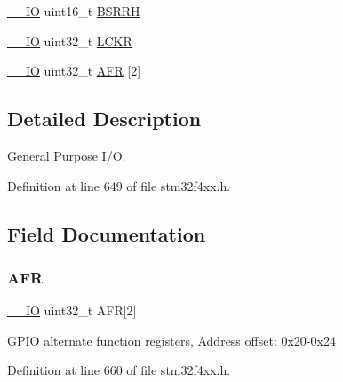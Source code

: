 \begin{DoxyCompactItemize}
\hyperlink{group___c_m_s_i_s__core__definitions_gaec43007d9998a0a0e01faede4133d6be}{\+\_\+\+\_\+\+IO} uint16\+\_\+t \hyperlink{struct_g_p_i_o___type_def_a35f89f65edca7ed58738166424aeef48}{B\+S\+R\+RH}
\item 
\hyperlink{group___c_m_s_i_s__core__definitions_gaec43007d9998a0a0e01faede4133d6be}{\+\_\+\+\_\+\+IO} uint32\+\_\+t \hyperlink{struct_g_p_i_o___type_def_a2612a0f4b3fbdbb6293f6dc70105e190}{L\+C\+KR}
\item 
\hyperlink{group___c_m_s_i_s__core__definitions_gaec43007d9998a0a0e01faede4133d6be}{\+\_\+\+\_\+\+IO} uint32\+\_\+t \hyperlink{struct_g_p_i_o___type_def_ab67c1158c04450d19ad483dcd2192e43}{A\+FR} \mbox{[}2\mbox{]}
\end{DoxyCompactItemize}


\subsection{Detailed Description}
General Purpose I/O. 

Definition at line 649 of file stm32f4xx.\+h.



\subsection{Field Documentation}
\mbox{\label{struct_g_p_i_o___type_def_ab67c1158c04450d19ad483dcd2192e43}} 
\subsubsection{\texorpdfstring{A\+FR}{AFR}}
{\footnotesize\ttfamily \hyperlink{group___c_m_s_i_s__core__definitions_gaec43007d9998a0a0e01faede4133d6be}{\+\_\+\+\_\+\+IO} uint32\+\_\+t A\+FR\mbox{[}2\mbox{]}}

G\+P\+IO alternate function registers, Address offset\+: 0x20-\/0x24 

Definition at line 660 of file stm32f4xx.\+h.

\mbox{\label{struct_g_p_i_o___type_def_a35f89f65edca7ed58738166424aeef48}} 
